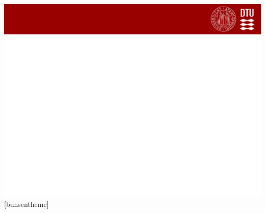 \documentclass{beamer}
\begin{document}
 {\includegraphics[width=\paperwidth,height=\paperheight]{slide_bg}}
[bunsentheme]
\end{document}
